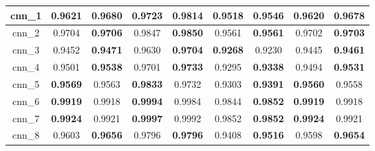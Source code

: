 \begin{table}[h]
\begin{tabular} {|c|c|c|c|c|c|c|c|c| }
        cnn\_1   & 0.9621                              & \textbf{0.9680}                     & 0.9723                              & \textbf{0.9814}                & 0.9518                              & \textbf{0.9546}                     & 0.9620                              & \textbf{0.9678}                     \\ \hline
        cnn\_2   & 0.9704                              & \textbf{0.9706}                     & 0.9847                              & \textbf{0.9850}                & 0.9561                              & \textbf{0.9561}                     & 0.9702                              & \textbf{0.9703}                     \\ \hline
        cnn\_3   & 0.9452                              & \textbf{0.9471}                     & 0.9630                              & \textbf{0.9704}                & \textbf{0.9268}                     & 0.9230                              & 0.9445                              & \textbf{0.9461}                     \\ \hline
        cnn\_4   & 0.9501                              & \textbf{0.9538}                     & 0.9701                              & \textbf{0.9733}                & 0.9295                              & \textbf{0.9338}                     & 0.9494                              & \textbf{0.9531}                     \\ \hline
        cnn\_5   & \textbf{0.9569}                     & 0.9563                              & \textbf{0.9833}                     & 0.9732                         & 0.9303                              & \textbf{0.9391}                     & \textbf{0.9560}                     & 0.9558                              \\ \hline
        cnn\_6   & \textbf{0.9919}                     & 0.9918                              & \textbf{0.9994}                     & 0.9984                         & 0.9844                              & \textbf{0.9852}                     & \textbf{0.9919}                     & 0.9918                              \\ \hline
        cnn\_7   & \textbf{0.9924}                     & \cellcolor{green!50}0.9921          & \textbf{\cellcolor{green!50}0.9997} & 0.9992                         & 0.9852                              & \textbf{0.9852}                     & \textbf{0.9924}                     & \cellcolor{green!50}0.9921          \\ \hline
        cnn\_8   & 0.9603                              & \textbf{0.9656}                     & 0.9796                              & \textbf{0.9796}                & 0.9408                              & \textbf{0.9516}                     & 0.9598                              & \textbf{0.9654}                     \\ \hline

\end{tabular}
\end{table}

